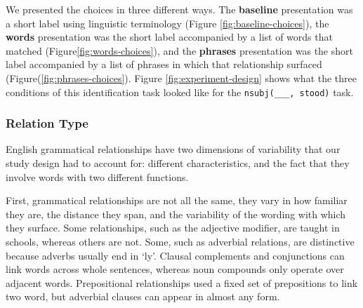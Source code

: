 \documentclass{sigchi}
\newcommand{\strong}[1] {\textbf{#1}}
\newcommand{\code}[1] {\texttt{#1}}
\begin{document}
We presented the choices in three different ways. The \strong{baseline} presentation was a short label using linguistic terminology (Figure \ref{fig:baseline-choices}), the \strong{words} presentation was the short label accompanied by a list of words that matched (Figure\ref{fig:words-choices}), and the \strong{phrases} presentation was the short label accompanied by a list of phrases in which that relationship surfaced (Figure(\ref{fig:phrases-choices}).  Figure \ref{fig:experiment-design} shows what the three conditions of this identification task looked like for the \code{nsubj(\_\_\_, stood)} task.


\subsubsection{Relation Type}
English grammatical relationships have two dimensions of variability that our study design had to account for: different characteristics, and the fact that they involve words with two different functions.

First, grammatical relationships are not all the same, they vary in how familiar they are, the distance they span, and the variability of the wording with which they surface.  Some relationships, such as the adjective modifier, are taught in schools, whereas others are not. Some, such as adverbial relations, are distinctive because adverbs usually end in `ly'. Clausal complements and conjunctions can link words across whole sentences, whereas noun compounds only operate over adjacent words. Prepositional relationships used a fixed set of prepositions to link two word, but adverbial clauses can appear in almost any form.
\end{document}
